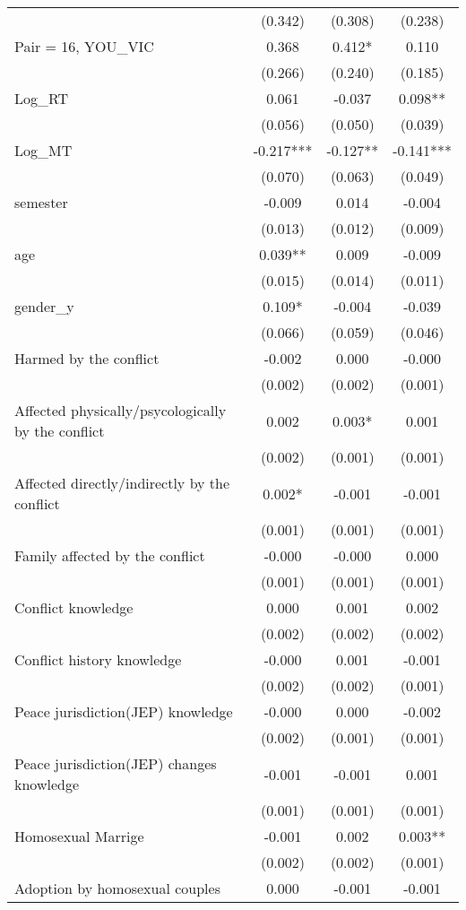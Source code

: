 \documentclass[]{article}
\begin{document}
\begin{tabular}{lccc}
 & (0.342) & (0.308) & (0.238) \\
Pair = 16, YOU\_VIC & 0.368 & 0.412* & 0.110 \\
 & (0.266) & (0.240) & (0.185) \\
Log\_RT & 0.061 & -0.037 & 0.098** \\
 & (0.056) & (0.050) & (0.039) \\
Log\_MT & -0.217*** & -0.127** & -0.141*** \\
 & (0.070) & (0.063) & (0.049) \\
semester & -0.009 & 0.014 & -0.004 \\
 & (0.013) & (0.012) & (0.009) \\
age & 0.039** & 0.009 & -0.009 \\
 & (0.015) & (0.014) & (0.011) \\
gender\_y & 0.109* & -0.004 & -0.039 \\
 & (0.066) & (0.059) & (0.046) \\
Harmed by the conflict & -0.002 & 0.000 & -0.000 \\
 & (0.002) & (0.002) & (0.001) \\
Affected physically/psycologically by the conflict & 0.002 & 0.003* & 0.001 \\
 & (0.002) & (0.001) & (0.001) \\
Affected directly/indirectly by the conflict & 0.002* & -0.001 & -0.001 \\
 & (0.001) & (0.001) & (0.001) \\
Family affected by the conflict & -0.000 & -0.000 & 0.000 \\
 & (0.001) & (0.001) & (0.001) \\
Conflict knowledge & 0.000 & 0.001 & 0.002 \\
 & (0.002) & (0.002) & (0.002) \\
Conflict history knowledge & -0.000 & 0.001 & -0.001 \\
 & (0.002) & (0.002) & (0.001) \\
Peace jurisdiction(JEP) knowledge & -0.000 & 0.000 & -0.002 \\
 & (0.002) & (0.001) & (0.001) \\
Peace jurisdiction(JEP) changes knowledge & -0.001 & -0.001 & 0.001 \\
 & (0.001) & (0.001) & (0.001) \\
Homosexual Marrige & -0.001 & 0.002 & 0.003** \\
 & (0.002) & (0.002) & (0.001) \\
Adoption by homosexual couples & 0.000 & -0.001 & -0.001 \\

\end{tabular}
\end{document}
